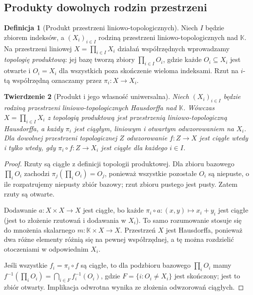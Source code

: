 \documentclass[11pt,a4paper]{article}
\numberwithin{equation}{section}
\theoremstyle{plain}
\newtheorem{twierdzenie}{Twierdzenie}[section]
\theoremstyle{definition}
\newtheorem{definicja}[twierdzenie]{Definicja}
\theoremstyle{remark}
\newcommand{\K}{\mathbb K}
\begin{document}
\subsection{Produkty dowolnych rodzin przestrzeni}

\begin{definicja}[Produkt przestrzeni liniowo-topologicznych]
Niech $I$ będzie zbiorem indeksów, a $(X_i)_{i\in I}$ rodziną
przestrzeni liniowo-topologicznych nad $\K$. Na przestrzeni
liniowej $X=\prod_{i\in I}X_i$ działań współrzędnych
wprowadzamy \emph{topologię produktową}: jej bazę tworzą zbiory
$\prod_{i\in I}O_i$, gdzie każde $O_i\subseteq X_i$ jest
otwarte i $O_i=X_i$ dla wszystkich poza skończenie wieloma
indeksami. Rzut na $i$-tą współrzędną oznaczamy przez
$\pi_i:X\to X_i$.
\end{definicja}

\begin{twierdzenie}[Produkt i jego własność uniwersalna]\label{thm:product-tvs}
Niech $(X_i)_{i\in I}$ będzie rodziną przestrzeni
liniowo-topologicznych Hausdorffa nad $\K$.
Wówczas $X=\prod_{i\in I}X_i$ z topologią produktową
jest przestrzenią liniowo-topologiczną Hausdorffa, a każdy
$\pi_i$ jest ciągłym, liniowym i otwartym odwzorowaniem na $X_i$.
Dla dowolnej przestrzeni topologicznej $Z$ odwzorowanie
$f:Z\to X$ jest ciągłe wtedy i tylko wtedy, gdy
$\pi_i\circ f:Z\to X_i$ jest ciągłe dla każdego $i\in I$.
\end{twierdzenie}
\begin{proof}
Rzuty są ciągłe z definicji topologii produktowej. Dla zbioru
bazowego $\prod_i O_i$ zachodzi $\pi_j(\prod_i O_i)=O_j$,
ponieważ wszystkie pozostałe $O_i$ są niepuste, o ile
rozpatrujemy niepusty zbiór bazowy; rzut zbioru pustego
jest pusty. Zatem rzuty są otwarte.

Dodawanie $a:X\times X\to X$ jest ciągłe, bo każde
$\pi_i\circ a:(x,y)\mapsto x_i+y_i$ jest ciągłe
(jest to złożenie rzutowań i dodawania w $X_i$).
To samo rozumowanie stosuje się do mnożenia skalarnego
$m:\K\times X\to X$. Przestrzeń $X$ jest Hausdorffa,
ponieważ dwa różne elementy różnią się na pewnej współrzędnej,
a tę można rozdzielić otoczeniami w odpowiednim $X_i$.

Jeśli wszystkie $f_i=\pi_i\circ f$ są ciągłe,
to dla podzbioru bazowego $\prod_iO_i$ mamy
$f^{-1}(\prod_iO_i)=\bigcap_{i\in F}f_i^{-1}(O_i)$,
gdzie $F=\{i:O_i\ne X_i\}$ jest skończony;
jest to zbiór otwarty. Implikacja odwrotna wynika
ze złożenia odwzorowań ciągłych.
\end{proof}
\end{document}
